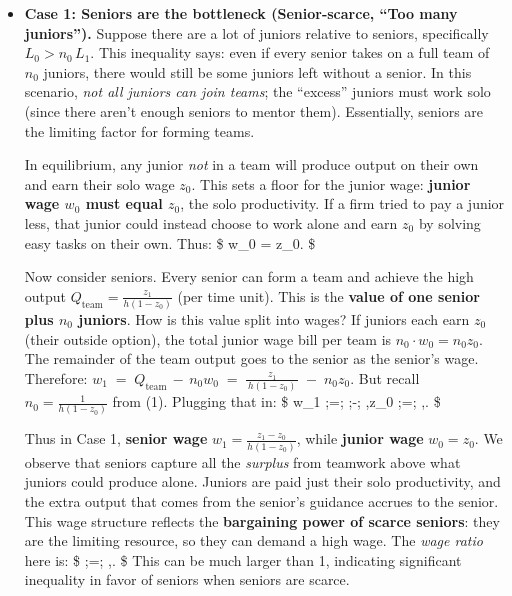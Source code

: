 \documentclass[12pt]{article}
\begin{document}
\begin{itemize}
\item
  \textbf{Case 1: Seniors are the bottleneck (Senior-scarce, ``Too many
  juniors'').} Suppose there are a lot of juniors relative to seniors,
  specifically \(L_0 > n_0 \,L_1\). This inequality says: even if every
  senior takes on a full team of \(n_0\) juniors, there would still be
  some juniors left without a senior. In this scenario, \emph{not all
  juniors can join teams}; the ``excess'' juniors must work solo (since
  there aren't enough seniors to mentor them). Essentially, seniors are
  the limiting factor for forming teams.

  In equilibrium, any junior \emph{not} in a team will produce output on
  their own and earn their solo wage \(z_0\). This sets a floor for the
  junior wage: \textbf{junior wage \(w_0\) must equal \(z_0\)}, the solo
  productivity. If a firm tried to pay a junior less, that junior could
  instead choose to work alone and earn \(z_0\) by solving easy tasks on
  their own. Thus: \$ w\_0 = z\_0. \$

  Now consider seniors. Every senior can form a team and achieve the
  high output \(Q_{\text{team}} = \frac{z_1}{h(1-z_0)}\) (per time
  unit). This is the \textbf{value of one senior plus \(n_0\) juniors}.
  How is this value split into wages? If juniors each earn \(z_0\)
  (their outside option), the total junior wage bill per team is
  \(n_0 \cdot w_0 = n_0 z_0\). The remainder of the team output goes to
  the senior as the senior's wage. Therefore:
  \(w_1 \;=\; Q_{\text{team}} \,-\, n_0 w_0 \;=\; \frac{z_1}{\,h(1-z_0)\,} \;-\; n_0 z_0.\)
  But recall \(n_0 = \frac{1}{h(1-z_0)}\) from (1). Plugging that in: \$
  w\_1 ;=;  ;-;  ,z\_0 ;=;
  ,. \$

  Thus in Case 1, \textbf{senior wage}
  \(w_1 = \frac{z_1 - z_0}{h(1-z_0)}\), while \textbf{junior wage}
  \(w_0 = z_0\). We observe that seniors capture all the \emph{surplus}
  from teamwork above what juniors could produce alone. Juniors are paid
  just their solo productivity, and the extra output that comes from the
  senior's guidance accrues to the senior. This wage structure reflects
  the \textbf{bargaining power of scarce seniors}: they are the limiting
  resource, so they can demand a high wage. The \emph{wage ratio} here
  is: \$  ;=; ,.
  \$ This can be much larger than 1, indicating significant
  inequality in favor of seniors when seniors are scarce.


\end{itemize}
\end{document}
